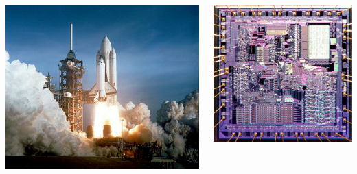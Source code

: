 \documentclass[xcolor=table,serif]{beamer}
\begin{document}
\begin{frame}
\begin{columns}
	\pause
	\centerline{\includegraphics[scale=0.5]{space_age.jpg}}	
	\pause
	\centerline{\includegraphics[scale=0.1]{microprocessor.jpg}}	
	\end{columns}
	\end{frame}
	
\end{document}
